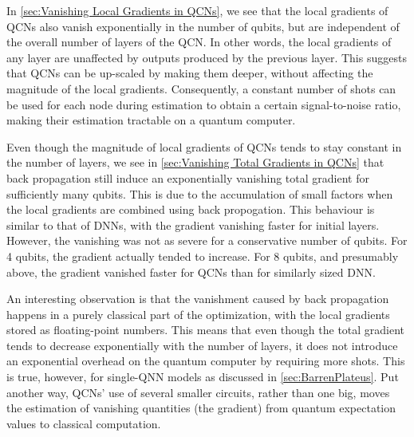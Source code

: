 In \autoref{sec:Vanishing Local Gradients in QCNs}, we see that the local gradients of QCNs also vanish exponentially in the number of qubits, but are independent of the overall number of layers of the QCN. In other words, the local gradients of any layer are unaffected by outputs produced by the previous layer. This suggests that QCNs can be up-scaled by making them deeper, without affecting the magnitude of the local gradients. Consequently, a constant number of shots can be used for each node during estimation to obtain a certain signal-to-noise ratio, making their estimation tractable on a quantum computer. 

Even though the magnitude of local gradients of QCNs tends to stay constant in the number of layers, we see in \autoref{sec:Vanishing Total Gradients in QCNs} that back propagation still induce an exponentially vanishing total gradient for sufficiently many qubits. This is due to the accumulation of small factors when the local gradients are combined using back propogation. This behaviour is similar to that of DNNs, with the gradient vanishing faster for initial layers. However, the vanishing was not as severe for a conservative number of qubits. For 4 qubits, the gradient actually tended to increase. For 8 qubits, and presumably above, the gradient vanished faster for QCNs than for similarly sized DNN.  

An interesting observation is that the vanishment caused by back propagation happens in a purely classical part of the optimization, with the local gradients stored as floating-point numbers. This means that even though the total gradient tends to decrease exponentially with the number of layers, it does not introduce an exponential overhead on the quantum computer by requiring more shots. This is true, however, for single-QNN models as discussed in \autoref{sec:BarrenPlateus}. Put another way, QCNs' use of several smaller circuits, rather than one big, moves the estimation of vanishing quantities (the gradient) from quantum expectation values to classical computation. 



